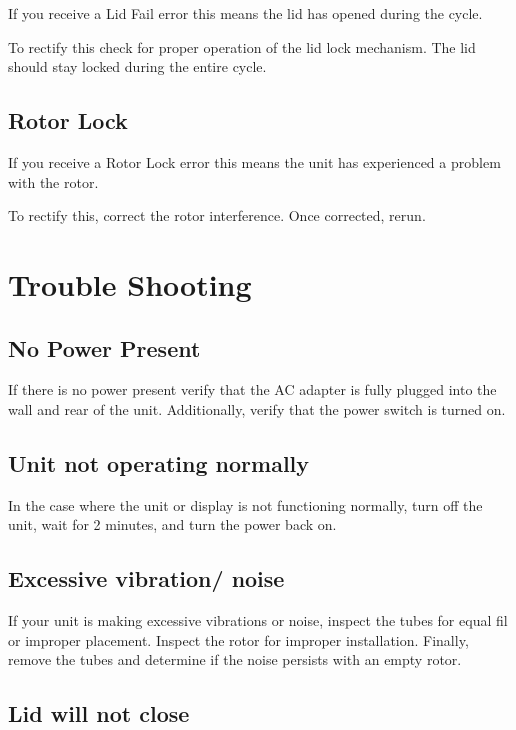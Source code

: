 \documentclass[12pt]{../SOP3_beta}
\begin{document}
\NP If you receive a Lid Fail error this means the lid has opened during the cycle. 

\NP To rectify this check for proper operation of the lid lock mechanism. The lid should stay locked during the entire cycle. 

\subsection*{Rotor Lock}

\NP If you receive a Rotor Lock error this means the unit has experienced a problem with the rotor. 

\NP To rectify this, correct the rotor interference. Once corrected, rerun. 

\section{Trouble Shooting}

\subsection*{No Power Present} 

\NP If there is no power present verify that the AC adapter is fully plugged into the wall and rear of the unit. Additionally, verify that the power switch is turned on. 

\subsection*{Unit not operating normally}

\NP In the case where the unit or display is not functioning normally, turn off the unit, wait for 2 minutes, and turn the power back on. 

\subsection*{Excessive vibration/ noise}

\NP If your unit is making excessive vibrations or noise, inspect the tubes for equal fil or improper placement. Inspect the rotor for improper installation. Finally, remove the tubes and determine if the noise persists with an empty rotor. 

\subsection*{Lid will not close}
\end{document}
